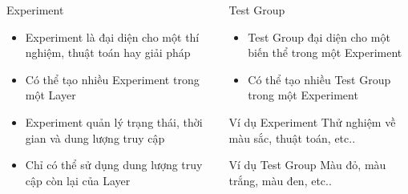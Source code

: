 
\begin{frame}
	\begin{columns}
		\begin{column}{0.5\textwidth}
			\begin{block}{Experiment}
				\begin{itemize}
					\item Experiment là đại diện cho một thí nghiệm, thuật toán hay giải pháp
					\item Có thể tạo nhiều Experiment trong một Layer
					\item Experiment quản lý trạng thái, thời gian và dung lượng truy cập
					\item Chỉ có thể sử dụng dung lượng truy cập còn lại của Layer
				\end{itemize}
			\end{block}
		\end{column}
		\begin{column}{0.5\textwidth}
			\begin{block}{Test Group}
				\begin{itemize}
					\item Test Group đại diện cho một biến thể trong một Experiment
					\item Có thể tạo nhiều Test Group trong một Experiment
				\end{itemize}
			\end{block}
			\begin{block}{Ví dụ Experiment}
				Thử nghiệm về màu sắc, thuật toán, etc..
			\end{block}
			\begin{block}{Ví dụ Test Group}
				Màu đỏ, màu trắng, màu đen, etc..
			\end{block}
		\end{column}
	\end{columns}
\end{frame}

